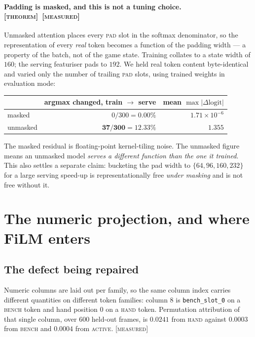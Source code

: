 \documentclass[11pt,a4paper]{article}
\newcommand{\tagM}{\textcolor{cV2}{\textsc{[measured]}}}
\newcommand{\tagT}{\textsc{[theorem]}}
\begin{document}
\paragraph{Padding is masked, and this is not a tuning choice. \tagT\ \tagM}
Unmasked attention places every \textsc{pad} slot in the softmax denominator, so
the representation of every \emph{real} token becomes a function of the padding
width --- a property of the batch, not of the game state. Training collates to a
state width of $160$; the serving featuriser pads to $192$. We held real token
content byte-identical and varied only the number of trailing \textsc{pad} slots,
using trained weights in evaluation mode:

\begin{center}
\begin{tabular}{lrr}
\toprule
& argmax changed, train $\to$ serve & mean $\max|\Delta \text{logit}|$ \\
\midrule
masked   & $0/300 = 0.00\%$          & $1.71\times10^{-6}$ \\
unmasked & $\mathbf{37/300 = 12.33\%}$ & $\mathbf{1.355}$ \\
\bottomrule
\end{tabular}
\end{center}

\noindent
The masked residual is floating-point kernel-tiling noise. The unmasked figure
means an unmasked model \emph{serves a different function than the one it
trained}. This also settles a separate claim: bucketing the pad width to
$\{64,96,160,232\}$ for a large serving speed-up is representationally free
\emph{under masking} and is not free without it.

\section{The numeric projection, and where FiLM enters}

\subsection{The defect being repaired}

Numeric columns are laid out per family, so the same column index carries
different quantities on different token families: column 8 is
\texttt{bench\_slot\_0} on a \textsc{bench} token and hand position $0$ on a
\textsc{hand} token. Permutation attribution of that single column, over 600
held-out frames, is $0.0241$ from \textsc{hand} against $0.0003$ from
\textsc{bench} and $0.0004$ from \textsc{active}. \tagM
\end{document}
